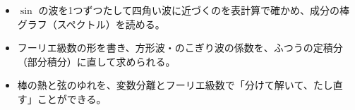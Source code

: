 \newcommand\kixbsq[4]{\begin{scope}[shift={#1}]
  \foreach \kixbk in {1,...,#4} {\draw[bkInk, line width=0.9pt] ({(\kixbk-1)*#2},0) -- ({(\kixbk-1)*#2},#3) -- ({(\kixbk-0.5)*#2},#3) -- ({(\kixbk-0.5)*#2},-#3) -- ({\kixbk*#2},-#3) -- ({\kixbk*#2},0);}
  \end{scope}}
\newcommand\kixbrod[3]{\begin{scope}[shift={#1}]
  \fill[bkYellow!25] (0,-3.4) rectangle (#2,3.4);
  \draw[bkOrange!70!black, line width=0.5pt, dash pattern=on 1.5pt off 1pt] (0,-3.4) rectangle (#2,3.4);
  \fill[#3] (0,-1.7) rectangle (#2,1.7);
  \draw[bkInk!70, line width=0.6pt] (0,-1.7) rectangle (#2,1.7);
  \end{scope}}
\makeatother


\begin{goal}
\begin{itemize}[label={\color{\bkTT}●}, leftmargin=1.6\zw, itemsep=0pt, topsep=1pt]
\item {}\enspace $\sin$ の波を1つずつたして四角い波に近づくのを表計算で確かめ、成分の棒グラフ（スペクトル）を読める。
\item {}\enspace フーリエ級数の形を書き、方形波・のこぎり波の係数を、ふつうの定積分（部分積分）に直して求められる。
\item {}\enspace 棒の熱と弦のゆれを、変数分離とフーリエ級数で「分けて解いて、たし直す」ことができる。
\end{itemize}
\end{goal}

